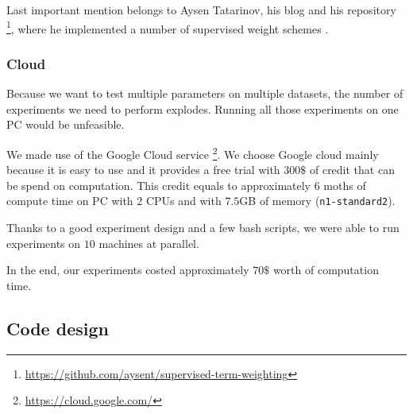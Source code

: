     Last important mention belongs to Aysen Tatarinov, his blog and his repository \footnote{\url{https://github.com/aysent/supervised-term-weighting}}, where he implemented a number of supervised weight schemes \cite{maas2011learning}.
    \* %
    
    
    \subsubsection{Cloud} 
    Because we want to test multiple parameters on multiple datasets, the number of experiments we need to perform explodes.
    Running all those experiments on one PC would be unfeasible.
    
    We made use of the Google Cloud service \footnote{\url{https://cloud.google.com/}}.
    We choose Google cloud mainly because it is easy to use and it provides a free trial with $300\$$ of credit that can be spend on computation. 
    This credit equals to approximately $6$ moths of compute time on PC with $2$ CPUs and with $7.5$GB of memory (\texttt{n1-standard2}).
    
    Thanks to a good experiment design and a few bash scripts,
    we were able to run experiments on $10$ machines at parallel.
    
    
    \* %
    In the end, our experiments costed approximately $70\$$ worth of computation time.
    
    \subsection{Code design} 
    
    \* %
    

    